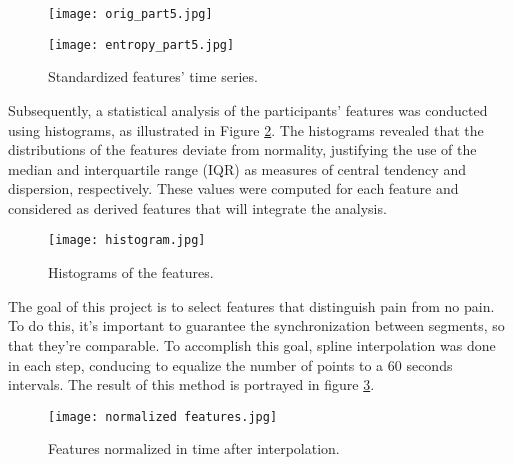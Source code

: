 \begin{figure}[htbp]
    \centering
    \begin{minipage}{0.48\textwidth}
        \centering
        \texttt{[image: orig\_part5.jpg]}
    \end{minipage}
    \hspace{0.005\textwidth} %
    \begin{minipage}{0.48\textwidth}
        \centering
        \texttt{[image: entropy\_part5.jpg]}
    \end{minipage}
    \caption{Standardized features' time series.}
    \label{fig:featurestimeseries}
\end{figure}

Subsequently, a statistical analysis of the participants’ features was conducted using histograms, as illustrated in Figure \ref{fig:histogram}. The histograms revealed that the distributions of the features deviate from normality, justifying the use of the median and interquartile range (IQR) as measures of central tendency and dispersion, respectively.
These values were computed for each feature and considered as derived features that will integrate the analysis.

\begin{figure}[h!]
    \centering
    \texttt{[image: histogram.jpg]}
    \caption{Histograms of the features.}
    \label{fig:histogram}
\end{figure}

The goal of this project is to select features that distinguish pain from no pain. To do this, it’s important to guarantee the synchronization between segments, so that they’re comparable. To accomplish this goal, spline interpolation was done in each step, conducing to equalize the number of points to a 60 seconds intervals. The result of this method is portrayed in figure \ref{fig:normalizedfeatures}. 

\begin{figure}[h!]
    \centering
    \texttt{[image: normalized features.jpg]}
    \caption{Features normalized in time after interpolation.}
    \label{fig:normalizedfeatures}
\end{figure}









